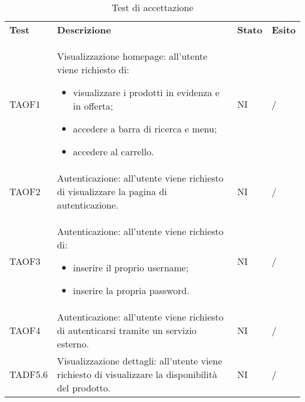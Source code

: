 \begin{center}
    \centering
    \renewcommand{\arraystretch}{1.8}
    \label{tab:TestSistema}
    \begin{longtable}[!h]{p{60px} p{240px} p{35px} p{35px}}
        \caption{Test di accettazione}                                                                                                                                                                                                           \\
        \rowcolor{logo!70} \textbf{Test} & \textbf{Descrizione}                                                                                                                                                & \textbf{Stato} & \textbf{Esito} \\
        TAOF1                            & Visualizzazione homepage: all'utente viene richiesto di: \begin{itemize} \item visualizzare i prodotti in evidenza e in offerta; \item accedere a barra di ricerca e menu; \item accedere al carrello. \end{itemize}                                                                                 & NI             & /             \\
        TAOF2                            & Autenticazione: all'utente viene richiesto di visualizzare la pagina di autenticazione.                                                                             & NI             & /             \\
        TAOF3                            & Autenticazione: all'utente viene richiesto di: \begin{itemize} \item inserire il proprio username; \item inserire la propria password. \end{itemize}                                                                                           & NI             & /             \\
        TAOF4                            & Autenticazione: all'utente viene richiesto di autenticarsi tramite un servizio esterno.                                                                             & NI             & /             \\
        TADF5.6                          & Visualizzazione dettagli: all'utente viene richiesto di visualizzare la disponibilità del prodotto.                                                                 & NI             & /             \\

\end{longtable}
\end{center}
